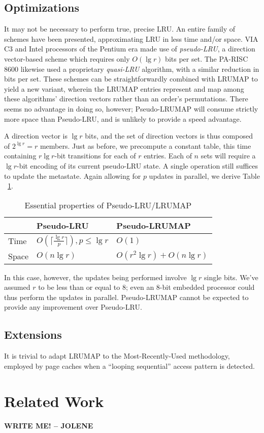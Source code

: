 \documentclass[10pt]{sigplanconf}
\begin{document}
\subsection{Optimizations}
It may not be necessary to perform true, precise LRU. An entire family of
schemes have been presented, approximating LRU in less time and/or space.
VIA C3\textsuperscript{\textregistered} and Intel processors of the Pentium\textsuperscript{\textregistered} era\citep{shanley} made use of
\textit{pseudo-LRU}, a direction vector-based scheme which requires only
$O(\lg{r})$ bits per set\citep{handy}. The PA-RISC 8600\citep{hurd} likewise used
a proprietary \textit{quasi-LRU} algorithm, with a similar reduction in bits
per set. These schemes can be straightforwardly combined with LRUMAP to yield a
new variant, wherein the LRUMAP entries represent and map among these
algorithms' direction vectors rather than an order's permutations. There seems
no advantage in doing so, however; Pseudo-LRUMAP will consume strictly more space
than Pseudo-LRU, and is unlikely to provide a speed advantage.

A direction vector is $\lg{r}$ bits, and the set of direction vectors is thus
composed of $2^{\lg{r}}=r$ members. Just as before, we precompute a constant
table, this time containing $r \lg{r}$-bit transitions for each of $r$
entries. Each of $n$ sets will require a $\lg{r}$-bit encoding of its current
pseudo-LRU state. A single operation still suffices to update the metastate.
Again allowing for $p$ updates in parallel, we derive Table ~\ref{tab:plru}.

\begin{table}[h]
\begin{center}
	\begin{tabular}{|l|l|l|}
	\hline
	& Pseudo-LRU & Pseudo-LRUMAP \\
	\hline
	Time & $O(\lceil\frac{\lg{r}}{p}\rceil), {p}\le{\lg{r}}$ & $O(1)$ \\
	\hline
	Space & $O(n\lg{r})$ & $O(r^{2}\lg{r}) + O(n\lg{r})$ \\
	\hline
	\end{tabular}
	\caption{Essential properties of Pseudo-LRU/LRUMAP}
\label{tab:plru}
\end{center}
\end{table}

In this case, however, the updates being performed involve $\lg{r}$ single bits.
We've assumed $r$ to be less than or equal to 8; even an 8-bit embedded processor
could thus perform the updates in parallel. Pseudo-LRUMAP cannot be expected to
provide any improvement over Pseudo-LRU.
\subsection{Extensions}
It is trivial to adapt LRUMAP to the Most-Recently-Used methodology, employed
by page caches when a ``looping sequential''\citep{dewitt} access pattern is
detected.
\section{Related Work}
\textbf{WRITE ME! -- JOLENE}


\end{document}
